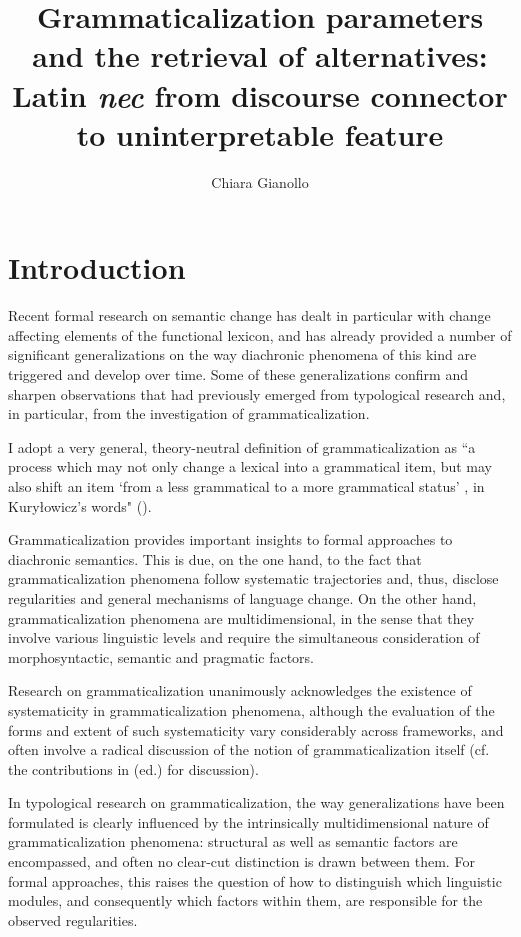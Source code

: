 \documentclass[output=paper,modfonts,nonflat,citecolor=brown,
showindex
]{langsci/langscibook}
\author{Chiara Gianollo\affiliation{Università di Bologna}}
\title{Grammaticalization parameters and the retrieval of alternatives: Latin {\em{nec}} from discourse connector to uninterpretable feature}
\begin{document}
\maketitle

\section{Introduction}

Recent formal research on semantic change has dealt in particular with change affecting elements of the functional lexicon, and has already provided a number of significant generalizations on the way diachronic phenomena of this kind are triggered and develop over time. Some of these generalizations confirm and sharpen observations that had previously emerged from typological research and, in particular, from the investigation of grammaticalization. 

I adopt a very general, theory-neutral definition of grammaticalization as ``a process which may not only change a lexical into a grammatical item, but may also shift an item `from a less grammatical to a more grammatical status' , in Kury\l{}owicz's words" (\citealt[13]{Lehmann15}).

Grammaticalization provides important insights to formal approaches to diachronic semantics. This is due, on the one hand, to the fact that grammaticalization phenomena follow systematic trajectories and, thus, disclose regularities and general mechanisms of language change. On the other hand, grammaticalization phenomena are multidimensional, in the sense that they involve various linguistic levels and require the simultaneous consideration of morphosyntactic, semantic and pragmatic factors.

Research on grammaticalization unanimously acknowledges the existence of systematicity in grammaticalization phenomena, although the evaluation of the forms and extent of such systematicity vary considerably across frameworks, and often involve a radical discussion of the notion of grammaticalization itself (cf. the contributions in \citealt{Campbell01} (ed.) for discussion).

In typological research on grammaticalization, the way generalizations have been formulated is clearly influenced by the intrinsically multidimensional nature of grammaticalization phenomena: structural as well as semantic factors are encompassed, and often no clear-cut distinction is drawn between them. For formal approaches, this raises the question of how to distinguish which linguistic modules, and consequently which factors within them, are responsible for the observed regularities. 
\end{document}
